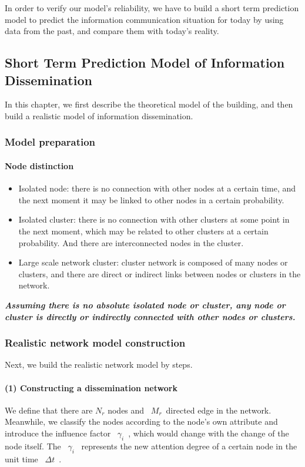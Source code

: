 \documentclass[a4paper,11pt]{article}
\begin{document}
\par In order to verify our model's reliability, we have to build a short term prediction model to predict the information communication situation for today by using data from the past, and compare them with today's reality.
\subsection{Short Term Prediction Model of Information Dissemination}
\par In this chapter, we first describe the theoretical model of the building, and then build a realistic model of information dissemination.
\subsubsection{Model preparation}
\paragraph{Node distinction}
\text{\\}
\begin{itemize}
\item Isolated node: there is no connection with other nodes at a certain time, and the next moment it may be linked to other nodes in a certain probability.
\item Isolated cluster: there is no connection with other clusters at some point in the next moment, which may be related to other clusters at a certain probability. And there are interconnected nodes in the cluster.
\item Large scale network cluster: cluster network is composed of many nodes or clusters, and there are direct or indirect links between nodes or clusters in the network.
\end{itemize}
\textbf{\emph{Assuming there is no absolute isolated node or cluster, any node or cluster is directly or indirectly connected with other nodes or clusters.}}



\subsubsection{Realistic network model construction}
\par Next, we build the realistic network model by steps.
\paragraph{(1) Constructing a dissemination network}
\text{\\}
\par We define that there are $N_r$ nodes and ~$M_r$~directed edge in the network. Meanwhile, we classify the nodes according to the node's own attribute and introduce the influence factor ~$\gamma _i$~, which would change with the change of the node itself. The ~$\gamma _i$~ represents the new attention degree of a certain node in the unit time ~$\Delta t$~.
\end{document}
